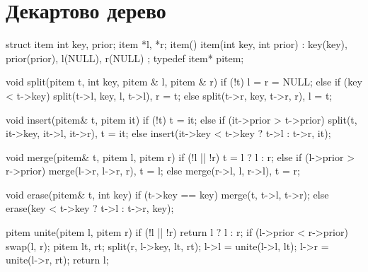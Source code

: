 \documentclass[12pt, titlepage]{article}
\begin{document}
\section{Декартово дерево}
\begin{cppcode}
struct item {
    int key, prior;
    item *l, *r;
    item() { }
    item(int key, int prior) : key(key), prior(prior), l(NULL), r(NULL) { }
};
typedef item* pitem;

void split(pitem t, int key, pitem & l, pitem & r) {
    if (!t)
        l = r = NULL;
    else if (key < t->key)
        split(t->l, key, l, t->l),  r = t;
    else
        split(t->r, key, t->r, r),  l = t;
}

void insert(pitem& t, pitem it) {
    if (!t)
        t = it;
    else if (it->prior > t->prior)
        split(t, it->key, it->l, it->r),  t = it;
    else
        insert(it->key < t->key ? t->l : t->r, it);
}

void merge(pitem& t, pitem l, pitem r) {
    if (!l || !r)
        t = l ? l : r;
    else if (l->prior > r->prior)
        merge(l->r, l->r, r),  t = l;
    else
        merge(r->l, l, r->l),  t = r;
}

void erase(pitem& t, int key) {
    if (t->key == key)
        merge(t, t->l, t->r);
    else
        erase(key < t->key ? t->l : t->r, key);
}

pitem unite(pitem l, pitem r) {
    if (!l || !r)  return l ? l : r;
    if (l->prior < r->prior)  swap(l, r);
    pitem lt, rt;
    split(r, l->key, lt, rt);
    l->l = unite(l->l, lt);
    l->r = unite(l->r, rt);
    return l;
}
\end{cppcode}
\end{document}

